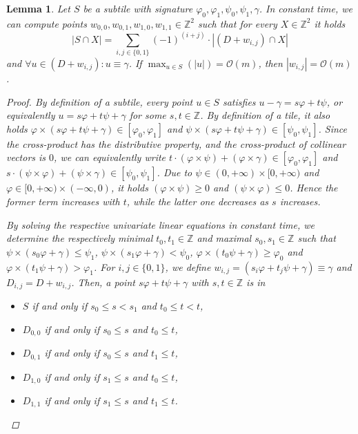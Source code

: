 \documentclass[a4paper,11pt]{article}
\newtheorem{lemma}{Lemma}[section]
\renewcommand{\O}{\mathcal{O}}
\renewcommand{\phi}{\varphi}
\newcommand{\absolute}[1]{\left\lvert#1\right\rvert}
\begin{document}
\begin{lemma}\label{primitive}
Let $S$ be a subtile with signature $\phi_0, \phi_1, \psi_0, \psi_1, \gamma$. In constant time, we can compute points $w_{0,0},w_{0,1},w_{1,0},w_{1,1} \in \mathbb Z^2$ such that for every $X \in \mathbb Z^2$ it holds
\[ \absolute{S \cap X} = \sum_{i,j \in \{0,1\}} (-1)^{(i+j)} \cdot \absolute{(D + w_{i,j}) \cap X}\]
and $\forall u \in (D + w_{i,j}) : u \equiv \gamma$. If $\max_{u \in S}(\absolute{u}) = \O(m)$, then $\absolute{w_{i,j}} = \O(m)$.

\begin{proof}
By definition of a subtile, every point $u \in S$ satisfies $u - \gamma = s\phi + t\psi$, or equivalently $u = s\phi + t\psi + \gamma$ for some $s,t\in\mathbb Z$. 
By definition of a tile, it also holds $\phi \times (s\phi + t\psi + \gamma) \in [\phi_0, \phi_1]$ and $\psi \times (s\phi + t\psi + \gamma) \in [\psi_0, \psi_1]$. Since the cross-product has the distributive property, and the cross-product of collinear vectors is $0$, we can equivalently write $t \cdot (\phi \times \psi) + (\phi \times \gamma) \in [\phi_0, \phi_1]$ and $s \cdot (\psi \times \phi) + (\psi \times \gamma) \in [\psi_0, \psi_1]$. 
Due to $\psi \in (0, +\infty) \times [0, +\infty)$ and $\phi \in [0, +\infty) \times (-\infty, 0)$, it holds $(\phi \times \psi) \geq 0$ and $(\psi \times \phi) \leq 0$. Hence the former term increases with $t$, while the latter one decreases as $s$ increases.

By solving the respective univariate linear equations in constant time, we determine the respectively minimal $t_0, t_1 \in \mathbb Z$ and maximal $s_0, s_1 \in \mathbb Z$ such that $\psi \times (s_0\phi + \gamma) \leq \psi_1$, $\psi \times (s_1\phi + \gamma) < \psi_0$, $\phi \times (t_0\psi + \gamma) \geq \phi_0$ and $\phi \times (t_1\psi + \gamma) > \phi_1$.
For $i,j \in \{0, 1\}$, we define $w_{i, j} = (s_i\phi + t_j\psi + \gamma) \equiv \gamma$ and $D_{i,j} = D + w_{i,j}$. 
Then, a point $s\phi + t\psi + \gamma$ with $s,t \in \mathbb Z$ is in 
\begin{itemize}
	\item $S$ if and only if $s_0 \leq s < s_1$ and $t_0 \leq t < t$, 
	\item $D_{0, 0}$ if and only if $s_0 \leq s$ and $t_0 \leq t$, 
	\item $D_{0, 1}$ if and only if $s_0 \leq s$ and $t_1 \leq t$, 
	\item $D_{1, 0}$ if and only if $s_1 \leq s$ and $t_0 \leq t$, 
	\item $D_{1, 1}$ if and only if $s_1 \leq s$ and $t_1 \leq t$.
\end{itemize}


\end{proof}
\end{lemma}
\end{document}
